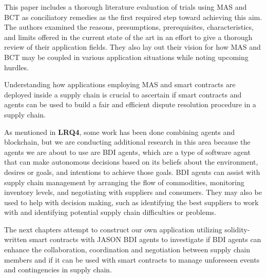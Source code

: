 \begin{itemize}[label={}]
\vspace{.5cm}

This paper\cite{literature} includes a thorough literature evaluation of trials using \ac{MAS} and \ac{BCT} as conciliatory remedies as the first required step toward achieving this aim. The authors examined the reasons, presumptions, prerequisites, characteristics, and limits offered in the current state of the art in an effort to give a thorough review of their application fields. They also lay out their vision for how \ac{MAS} and \ac{BCT} may be coupled in various application situations while noting upcoming hurdles.
\end{itemize}

\vspace{.5cm}

Understanding how applications employing \ac{MAS} and smart contracts are deployed inside a supply chain is crucial to ascertain if smart contracts and agents can be used to build a fair and efficient dispute resolution procedure in a supply chain. 

\vspace{.5cm}

As mentioned in \textbf{LRQ4}, some work has been done combining agents and blockchain, but we are conducting additional research in this area because the agents we are about to use are \ac{BDI} agents, which are a type of software agent that can make autonomous decisions based on its beliefs about the environment, desires or goals, and intentions to achieve those goals. \ac{BDI} agents can assist with supply chain management by arranging the flow of commodities, monitoring inventory levels, and negotiating with suppliers and consumers. They may also be used to help with decision making, such as identifying the best suppliers to work with and identifying potential supply chain difficulties or problems.

\vspace{.5cm}

The next chapters attempt to construct our own application utilizing solidity-written smart contracts with JASON BDI agents to investigate if \ac{BDI} agents can enhance the collaboration, coordination and negotiation between supply chain members and if it can be used with smart contracts to manage unforeseen events and contingencies in supply chain.